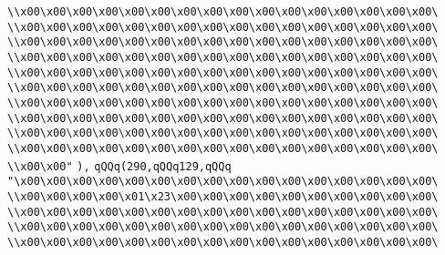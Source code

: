 \verb|\\x00\x00\x00\x00\x00\x00\x00\x00\x00\x00\x00\x00\x00\x00\x00\x00\|\newline
\verb|\\x00\x00\x00\x00\x00\x00\x00\x00\x00\x00\x00\x00\x00\x00\x00\x00\|\newline
\verb|\\x00\x00\x00\x00\x00\x00\x00\x00\x00\x00\x00\x00\x00\x00\x00\x00\|\newline
\verb|\\x00\x00\x00\x00\x00\x00\x00\x00\x00\x00\x00\x00\x00\x00\x00\x00\|\newline
\verb|\\x00\x00\x00\x00\x00\x00\x00\x00\x00\x00\x00\x00\x00\x00\x00\x00\|\newline
\verb|\\x00\x00\x00\x00\x00\x00\x00\x00\x00\x00\x00\x00\x00\x00\x00\x00\|\newline
\verb|\\x00\x00\x00\x00\x00\x00\x00\x00\x00\x00\x00\x00\x00\x00\x00\x00\|\newline
\verb|\\x00\x00\x00\x00\x00\x00\x00\x00\x00\x00\x00\x00\x00\x00\x00\x00\|\newline
\verb|\\x00\x00\x00\x00\x00\x00\x00\x00\x00\x00\x00\x00\x00\x00\x00\x00\|\newline
\verb|\\x00\x00\x00\x00\x00\x00\x00\x00\x00\x00\x00\x00\x00\x00\x00\x00\|\newline
\verb|\\x00\x00"|\newline
\verb|),|\newline
\verb|qQQq(290,qQQq129,qQQq|\newline
\verb|"\x00\x00\x00\x00\x00\x00\x00\x00\x00\x00\x00\x00\x00\x00\x00\x00\|\newline
\verb|\\x00\x00\x00\x00\x01\x23\x00\x00\x00\x00\x00\x00\x00\x00\x00\x00\|\newline
\verb|\\x00\x00\x00\x00\x00\x00\x00\x00\x00\x00\x00\x00\x00\x00\x00\x00\|\newline
\verb|\\x00\x00\x00\x00\x00\x00\x00\x00\x00\x00\x00\x00\x00\x00\x00\x00\|\newline
\verb|\\x00\x00\x00\x00\x00\x00\x00\x00\x00\x00\x00\x00\x00\x00\x00\x00\|\newline

